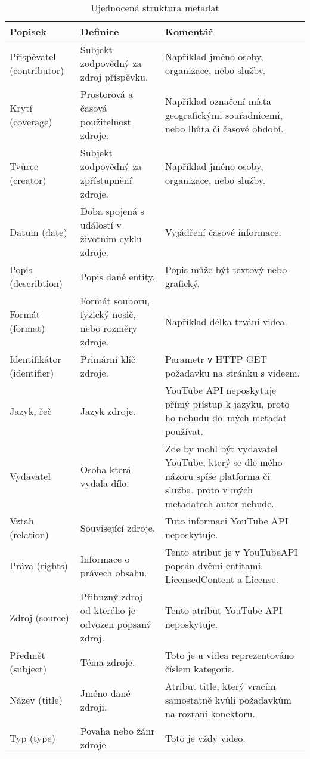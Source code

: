 \begin{table}[h!]
\begin{tabular}{|p{} | p{} | p{}|}
\hline
Popisek & Definice & Komentář\\
\hline
Přispěvatel (contributor) & Subjekt zodpovědný za zdroj příspěvku. & Například jméno osoby, organizace, nebo služby.\\
\hline
Krytí (coverage) & Prostorová a časová použitelnost zdroje. & Například označení místa geografickými souřadnicemi, nebo lhůta či časové období.\\
\hline
Tvůrce (creator) & Subjekt zodpovědný za zpřístupnění zdroje. & Například jméno osoby, organizace, nebo služby.\\
\hline
Datum (date) & Doba spojená s událostí v životním cyklu zdroje. & Vyjádření časové informace. \\
\hline
Popis (describtion) & Popis dané entity. & Popis může být textový nebo grafický. \\
\hline
Formát (format) & Formát souboru, fyzický nosič, nebo rozměry zdroje. & Například délka trvání videa. \\
\hline
Identifikátor (identifier) & Primární klíč zdroje. & Parametr \texttt{v} HTTP GET požadavku na stránku s videem.\\
\hline
Jazyk, řeč & Jazyk zdroje. & YouTube API neposkytuje přímý přístup k jazyku, proto ho nebudu do~mých metadat používat.\\
\hline
Vydavatel & Osoba která vydala dílo. & Zde by mohl být vydavatel YouTube, který se dle mého názoru spíše platforma či služba, proto v mých metadatech autor nebude.\\
\hline
Vztah (relation) & Související zdroje. & Tuto informaci YouTube API neposkytuje.\\
\hline
Práva (rights) & Informace o právech obsahu. & Tento atribut je v YouTubeAPI popsán dvěmi entitami. LicensedContent a License.\\
\hline
Zdroj (source) & Přibuzný zdroj od kterého je odvozen popsaný zdroj. & Tento atribut YouTube API neposkytuje.\\
\hline
Předmět (subject) & Téma zdroje. & Toto je u videa reprezentováno číslem kategorie.\\
\hline
Název (title) & Jméno dané zdroji. & Atribut title, který vracím samostatně kvůli požadavkům na rozraní konektoru.\\
\hline
Typ (type) & Povaha nebo žánr zdroje & Toto je vždy video.\\
\hline
\end{tabular}
\caption[DublinCore metadata]{Ujednocená struktura metadat}\label{tab:dublincore1}
\end{table}
\hfill